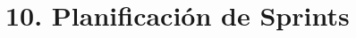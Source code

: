 \documentclass[
11pt, %
]{charter}
\begin{document}

\section{10. Planificación de Sprints}




\end{document}
